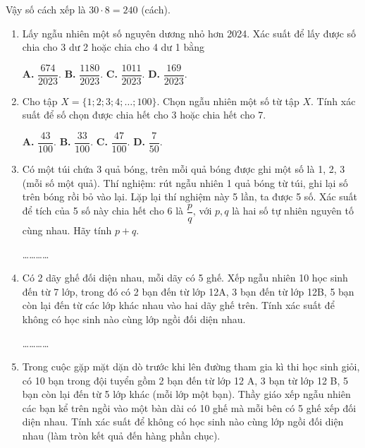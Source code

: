 \documentclass[12pt, a4paper]{article}
\begin{document}
	\noindent Vậy số cách xếp là $30 \cdot 8 = 240$ (cách).
	\begin{enumerate}[label=\bfseries\color{mymagenta}\arabic*., leftmargin=*]
		\setcounter{enumi}{0}
		\item Lấy ngẫu nhiên một số nguyên dương nhỏ hơn 2024. Xác suất để lấy được số chia cho 3 dư 2 hoặc chia cho 4 dư 1 bằng
	
			\textbf{A.} $\dfrac{674}{2023}$. \qquad\qquad
			\textbf{B.} $\dfrac{1180}{2023}$. \qquad\qquad
			\textbf{C.} $\dfrac{1011}{2023}$. \qquad\qquad
			\textbf{D.} $\dfrac{169}{2023}$.
	
		
		\vspace{0.3cm}
		
		\item Cho tập $X = \{1; 2; 3; 4; \dots; 100\}$. Chọn ngẫu nhiên một số từ tập $X$. Tính xác suất để số chọn được chia hết cho 3 hoặc chia hết cho 7.
	
			\textbf{A.} $\dfrac{43}{100}$. \qquad\qquad
			\textbf{B.} $\dfrac{33}{100}$. \qquad\qquad
			\textbf{C.} $\dfrac{47}{100}$. \qquad\qquad
			\textbf{D.} $\dfrac{7}{50}$.
	
		
		\vspace{0.3cm}
		
		\item Có một túi chứa 3 quả bóng, trên mỗi quả bóng được ghi một số là 1, 2, 3 (mỗi số một quả). Thí nghiệm: rút ngẫu nhiên 1 quả bóng từ túi, ghi lại số trên bóng rồi bỏ vào lại. Lặp lại thí nghiệm này 5 lần, ta được 5 số. Xác suất để tích của 5 số này chia hết cho 6 là $\dfrac{p}{q}$, với $p, q$ là hai số tự nhiên nguyên tố cùng nhau. Hãy tính $p + q$.
		
		 \dots\dots\dots\dots
		
		\vspace{0.3cm}
		
		\item Có 2 dãy ghế đối diện nhau, mỗi dãy có 5 ghế. Xếp ngẫu nhiên 10 học sinh đến từ 7 lớp, trong đó có 2 bạn đến từ lớp 12A, 3 bạn đến từ lớp 12B, 5 bạn còn lại đến từ các lớp khác nhau vào hai dãy ghế trên. Tính xác suất để không có học sinh nào cùng lớp ngồi đối diện nhau.
		
		 \dots\dots\dots\dots
		
		\vspace{0.3cm}
		
		\item Trong cuộc gặp mặt dặn dò trước khi lên đường tham gia kì thi học sinh giỏi, có 10 bạn trong đội tuyển gồm 2 bạn đến từ lớp 12 A, 3 bạn từ lớp 12 B, 5 bạn còn lại đến từ 5 lớp khác (mỗi lớp một bạn). Thầy giáo xếp ngẫu nhiên các bạn kể trên ngồi vào một bàn dài có 10 ghế mà mỗi bên có 5 ghế xếp đối diện nhau. Tính xác suất để không có học sinh nào cùng lớp ngồi đối diện nhau (làm tròn kết quả đến hàng phần chục).
		

\end{enumerate}
\end{document}
